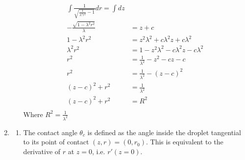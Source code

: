 \documentclass{X:/Documents/Coding/Latex/myassignment}
\begin{document}
\begin{enumerate}
\begin{enumerate}
	\begin{align*}
		\int \frac{1}{\sqrt{\frac{1}{\lambda^2 r^2} -1}} dr = \int dz\\
		-\frac{\sqrt{1 - \lambda^2 r^2}}{\lambda} &= z + c\\
		1 - \lambda^2 r^2 &= z^2 \lambda^2 + c \lambda^2 z + c \lambda^2\\
		\lambda^2 r^2 &= 1 - z^2 \lambda^2 - c \lambda^2 z - c \lambda^2\\
		r^2 &= \frac{1}{\lambda^2} - z^2 - c z - c\\
		r^2 &= \frac{1}{\lambda^2} - (z-c)^2\\
		(z-c)^2 + r^2 &= \frac{1}{\lambda^2}\\
		(z-c)^2 + r^2 &= R^2\\
	\end{align*}
	Where $R^2 = \frac{1}{\lambda^2}$
\end{enumerate}

	\item 
\begin{enumerate}
	\item The contact angle $\theta_c$ is defined as the angle inside the droplet tangential to its point of contact $(z,r) = (0,r_0)$. This is equivalent to the derivative of $r$ at $z=0$, i.e. $r'(z=0)$.


\end{enumerate}
\end{enumerate}
\end{document}
